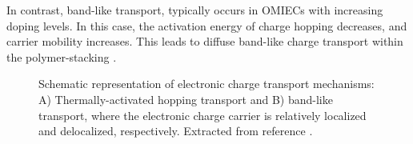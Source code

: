 In contrast, band-like transport, typically occurs in OMIECs with increasing doping levels. In this case, the activation energy of charge hopping decreases, and carrier mobility increases. This leads to diffuse band-like charge transport within the polymer-stacking \cite{wangHoppingTransportHall2012}.


\begin{figure}[h]
	\centering
	\hspace{2em}
	\caption[Electronic transport mechanisms in OMIECs]{Schematic representation of electronic charge transport mechanisms: A) Thermally-activated hopping transport %
	and B) band-like transport, %
	where the electronic charge carrier is relatively localized and delocalized, respectively. Extracted from reference \cite{paulsenOrganicMixedIonic2020}.} 
	\label{fig:etrans}
\end{figure}


